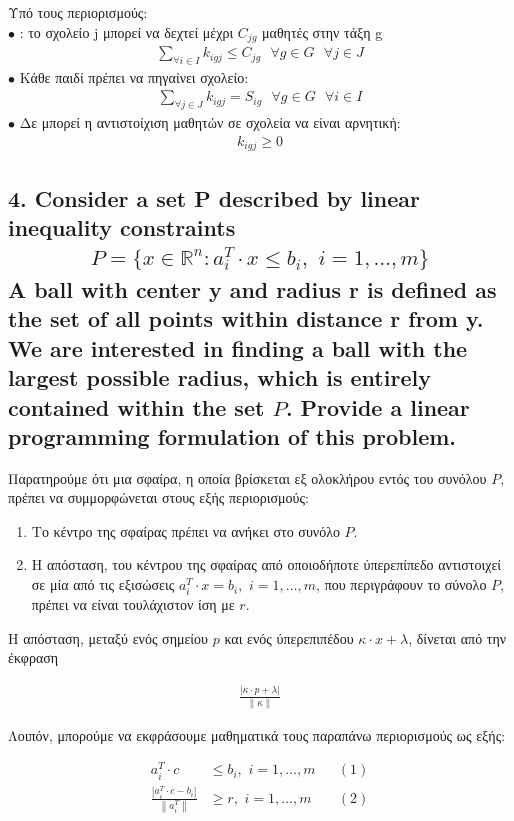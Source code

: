\documentclass[12pt]{article}
\newcommand{\R}{\mathbb{R}}
\newcommand{\centered}[1]{\begin{align*}#1\end{align*}}
\newcommand{\margin}{\hspace{4pt}}
\newcommand{\norm}[1]{\left\lVert#1\right\rVert}
\newcommand{\abs}[1]{\left\lvert#1\right\rvert}
\begin{document}
Υπό τους περιορισμούς: \\
\( \bullet \) : το σχολείο j μπορεί να δεχτεί μέχρι \( C_{jg} \) μαθητές στην τάξη g  \\
\centered{ \sum_{\forall i \in I}{ k_{igj} \leq C_{jg} } \mbox{ } \forall g \in G \mbox{ } \forall j \in J  }
\( \bullet \) Κάθε παιδί πρέπει να πηγαίνει σχολείο: \\
\centered{ \sum_{\forall j \in J}{ k_{igj} = S_{ig} } \mbox{ } \forall g \in G \mbox{ } \forall i \in I  }
\( \bullet \) Δε μπορεί η αντιστοίχιση μαθητών σε σχολεία να είναι αρνητική: \\
\centered{ k_{igj} \geq 0 }

\vspace{2in}

\pagebreak

\subsection*{4. Consider a set P described by linear inequality constraints
\centered{P = \{x \in \R^n : a^{T}_{i} \cdot x \leq b_i, \margin i = 1, \dotsc, m\}}
A ball with center y and radius r is defined as the set of all points within distance r from y.
We are interested in finding a ball with the largest possible radius, which is entirely contained
within the set \( P \). Provide a linear programming formulation of this problem.}

Παρατηρούμε ότι μια σφαίρα, η οποία βρίσκεται εξ ολοκλήρου εντός του συνόλου \( P \),
πρέπει να συμμορφώνεται στους εξής περιορισμούς:

\begin{enumerate}
    \item Το κέντρο της σφαίρας πρέπει να ανήκει στο συνόλο \( P \).
    \item Η απόσταση, του κέντρου της σφαίρας από οποιοδήποτε ύπερεπίπεδο αντιστοιχεί σε μία
    από τις εξισώσεις \( a^{T}_{i} \cdot x = b_i, \margin i = 1, \dotsc, m\),
    που περιγράφουν το σύνολο \( P \), πρέπει να είναι τουλάχιστον ίση με \( r \).
\end{enumerate}

Η απόσταση, μεταξύ ενός σημείου \( p \) και ενός ύπερεπιπέδου \( κ \cdot x + λ \),
δίνεται από την έκφραση

\centered{\frac{\abs{κ \cdot p + λ}}{\norm{κ}}}

Λοιπόν, μπορούμε να εκφράσουμε μαθηματικά τους παραπάνω περιορισμούς ως εξής:

\begin{align*}
    a^{T}_{i} \cdot c & \leq b_i, \margin i = 1, \dotsc, m && (1)\\
    \frac{\abs{a^{T}_{i} \cdot c - b_i}}{\norm{a^{T}_{i}}} & \geq r, \margin i = 1, \dotsc, m && (2)
\end{align*}
\end{document}
